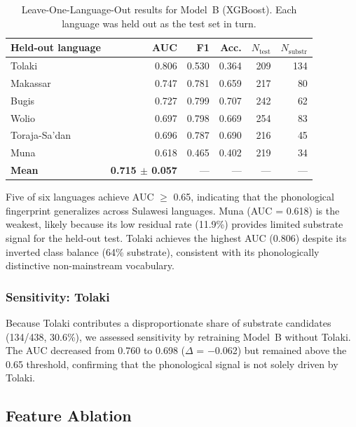 \documentclass[12pt]{article}
\begin{document}
\begin{table}[H]
\centering
\caption{Leave-One-Language-Out results for Model~B (XGBoost). Each language was held out as the test set in turn.}
\label{tab:lolo}
\begin{tabular}{lrrrrr}
\toprule
Held-out language & AUC & F1 & Acc. & $N_\mathrm{test}$ & $N_\mathrm{substr}$ \\
\midrule
Tolaki       & 0.806 & 0.530 & 0.364 & 209 & 134 \\
Makassar     & 0.747 & 0.781 & 0.659 & 217 &  80 \\
Bugis        & 0.727 & 0.799 & 0.707 & 242 &  62 \\
Wolio        & 0.697 & 0.798 & 0.669 & 254 &  83 \\
Toraja-Sa'dan & 0.696 & 0.787 & 0.690 & 216 &  45 \\
Muna         & 0.618 & 0.465 & 0.402 & 219 &  34 \\
\midrule
\textbf{Mean} & \textbf{0.715 $\pm$ 0.057} & --- & --- & --- & --- \\
\bottomrule
\end{tabular}
\end{table}

Five of six languages achieve AUC $\geq$ 0.65, indicating that the phonological fingerprint generalizes across Sulawesi languages.
Muna (AUC = 0.618) is the weakest, likely because its low residual rate (11.9\%) provides limited substrate signal for the held-out test.
Tolaki achieves the highest AUC (0.806) despite its inverted class balance (64\% substrate), consistent with its phonologically distinctive non-mainstream vocabulary.

\subsubsection{Sensitivity: Tolaki}

Because Tolaki contributes a disproportionate share of substrate candidates (134/438, 30.6\%), we assessed sensitivity by retraining Model~B without Tolaki.
The AUC decreased from 0.760 to 0.698 ($\Delta$ = $-$0.062) but remained above the 0.65 threshold, confirming that the phonological signal is not solely driven by Tolaki.

\subsection{Feature Ablation}
\label{sec:results_ablation}
\end{document}
